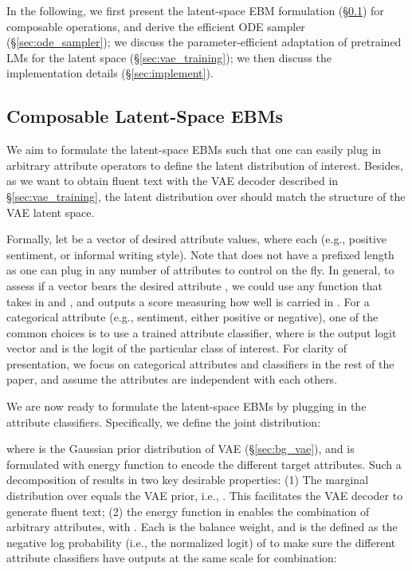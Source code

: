 \documentclass[11pt]{article}
\begin{document}
In the following, we first present the latent-space EBM formulation (\S\ref{sec:latent_ebms}) for composable operations, and derive the efficient ODE sampler (\S\ref{sec:ode_sampler}); we discuss the parameter-efficient adaptation of pretrained LMs for the latent space (\S\ref{sec:vae_training});  we then discuss the implementation details (\S\ref{sec:implement}).






\subsection{Composable Latent-Space EBMs}
\label{sec:latent_ebms}

We aim to formulate the latent-space EBMs such that one can easily plug in arbitrary attribute operators to define the latent distribution of interest. Besides, as we want to obtain fluent text with the VAE decoder  described in \S\ref{sec:vae_training}, the latent distribution over  should match the structure of the VAE latent space. 

Formally, let  be a vector of desired attribute values, where each  (e.g., positive sentiment, or informal writing style). Note that  does not have a prefixed length as one can plug in any number of attributes to control on the fly. In general, to assess if a vector  bears the desired attribute , we could use any function  that takes in  and , and outputs a score measuring how well  is carried in . 
For a categorical attribute (e.g., sentiment, either positive or negative), one of the common choices is to use a trained attribute classifier, where  is the output logit vector and  is the logit of the particular class  of interest. For clarity of presentation, we focus on categorical attributes and classifiers in the rest of the paper, and assume the attributes are independent with each others. 

We are now ready to formulate the latent-space EBMs by plugging in the attribute classifiers. Specifically, we define the joint distribution:

where  is the Gaussian prior distribution of VAE (\S\ref{sec:bg_vae}), and  is formulated with energy function  to encode the different target attributes. Such a decomposition of  results in two key desirable properties: (1)
The marginal distribution over  equals the VAE prior, i.e., . This facilitates the VAE decoder to generate fluent text;
(2) the energy function in  enables the combination of arbitrary attributes, with . Each  is the balance weight, and  is the defined as the negative log probability (i.e., the normalized logit) of  to make sure the different attribute classifiers have outputs at the same scale for combination:
\end{document}

